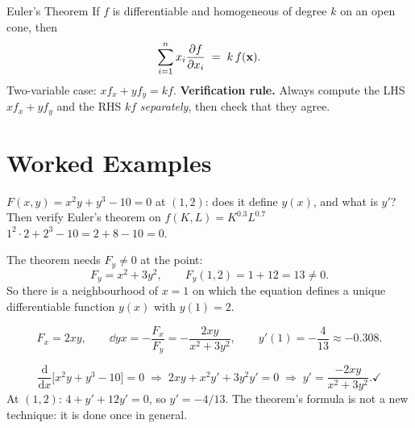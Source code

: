 \begin{rulebox}{Euler's Theorem}
If $f$ is differentiable and homogeneous of degree $k$ on an open cone,
then
\[
  \sum_{i=1}^{n} x_{i}\frac{\partial f}{\partial x_{i}} \;=\; k\,f(\mathbf{x}) .
\]
Two-variable case: $xf_{x}+yf_{y}=kf$. \textbf{Verification rule.} Always
compute the LHS $xf_{x}+yf_{y}$ and the RHS $kf$ \emph{separately}, then
check that they agree.
\end{rulebox}

\section{Worked Examples}

\begin{worked}{$F(x,y)=x^{2}y+y^{3}-10=0$ at $(1,2)$: does it define $y(x)$, and what is $y'$? Then verify Euler's theorem on $f(K,L)=K^{0.3}L^{0.7}$}
$1^{2}\cdot2+2^{3}-10=2+8-10=0$. \checkmark

The theorem needs $F_{y}\neq0$ at the point:
\[
  F_{y}=x^{2}+3y^{2},
  \qquad
  F_{y}(1,2)=1+12=13\neq0 .
\]
So there is a neighbourhood of $x=1$ on which the equation defines a unique
differentiable function $y(x)$ with $y(1)=2$.

\[
  F_{x}=2xy,
  \qquad
  \dd{y}{x}=-\frac{F_{x}}{F_{y}}=-\frac{2xy}{x^{2}+3y^{2}},
  \qquad
  y'(1)=-\frac{4}{13}\approx-0.308 .
\]

\[
  \frac{\mathrm{d}}{\mathrm{d}x}\bigl[x^{2}y+y^{3}-10\bigr]=0
  \;\Longrightarrow\;
  2xy+x^{2}y'+3y^{2}y'=0
  \;\Longrightarrow\;
  y'=\frac{-2xy}{x^{2}+3y^{2}} . \checkmark
\]
At $(1,2)$: $4+y'+12y'=0$, so $y'=-4/13$. The theorem's formula is not a new
technique: it is  done once in general.


\end{worked}
